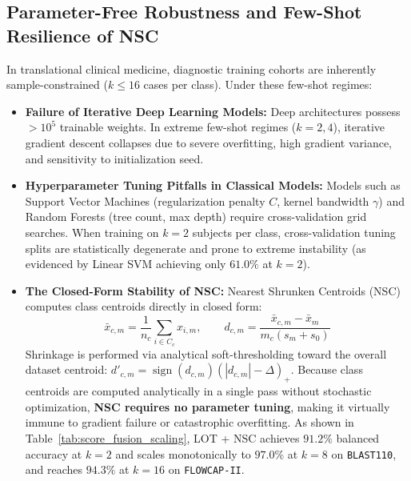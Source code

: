 \documentclass[10pt]{article}
\begin{document}
\subsection{Parameter-Free Robustness and Few-Shot Resilience of NSC}
In translational clinical medicine, diagnostic training cohorts are inherently sample-constrained ($k \le 16$ cases per class). Under these few-shot regimes:
\begin{itemize}\setlength{\itemsep}{1pt}\setlength{\parskip}{0pt}
    \item \textbf{Failure of Iterative Deep Learning Models:} Deep architectures possess $>10^5$ trainable weights. In extreme few-shot regimes ($k=2, 4$), iterative gradient descent collapses due to severe overfitting, high gradient variance, and sensitivity to initialization seed.
    \item \textbf{Hyperparameter Tuning Pitfalls in Classical Models:} Models such as Support Vector Machines (regularization penalty $C$, kernel bandwidth $\gamma$) and Random Forests (tree count, max depth) require cross-validation grid searches. When training on $k=2$ subjects per class, cross-validation tuning splits are statistically degenerate and prone to extreme instability (as evidenced by Linear SVM achieving only $61.0\%$ at $k=2$).
    \item \textbf{The Closed-Form Stability of NSC:} Nearest Shrunken Centroids (NSC) computes class centroids directly in closed form:
    \begin{equation}
    \bar{x}_{c,m} = \frac{1}{n_c} \sum_{i \in C_c} x_{i,m}, \qquad d_{c,m} = \frac{\bar{x}_{c,m} - \bar{x}_m}{m_c (s_m + s_0)}
    \end{equation}
    Shrinkage is performed via analytical soft-thresholding toward the overall dataset centroid: $d'_{c,m} = \operatorname{sign}(d_{c,m})(|d_{c,m}| - \Delta)_+$. Because class centroids are computed analytically in a single pass without stochastic optimization, \textbf{NSC requires no parameter tuning}, making it virtually immune to gradient failure or catastrophic overfitting. As shown in Table~\ref{tab:score_fusion_scaling}, LOT + NSC achieves $\mathbf{91.2\%}$ balanced accuracy at $k=2$ and scales monotonically to $\mathbf{97.0\%}$ at $k=8$ on \texttt{BLAST110}, and reaches $\mathbf{94.3\%}$ at $k=16$ on \texttt{FLOWCAP-II}.
\end{itemize}
\end{document}
